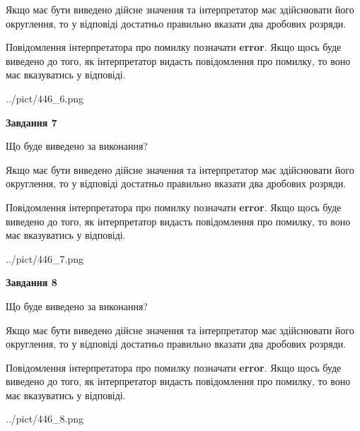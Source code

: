 \documentclass[12pt, ukrainian]{article}
\begin{document}
{\begin {Large}
Якщо має бути виведено дійсне значення та інтерпретатор має здійснювати його округлення, 
то у відповіді достатньо правильно вказати два дробових розряди.

Повідомлення інтерпретатора про помилку позначати \textbf{error}.
Якщо щось буде виведено до того, як інтерпретатор видасть повідомлення про помилку, 
то воно має вказуватись у відповіді. \par

\begin{center}
	{../pict/446_6.png}
\end{center}
\newpage

{\begin {center}\textbf{Завдання 7}\end {center}}\par
Що буде виведено за виконання? \par

Якщо має бути виведено дійсне значення та інтерпретатор має здійснювати його округлення, 
то у відповіді достатньо правильно вказати два дробових розряди.

Повідомлення інтерпретатора про помилку позначати \textbf{error}.
Якщо щось буде виведено до того, як інтерпретатор видасть повідомлення про помилку, 
то воно має вказуватись у відповіді. \par

\begin{center}
	{../pict/446_7.png}
\end{center}
\newpage

{\begin {center}\textbf{Завдання 8}\end {center}}\par
Що буде виведено за виконання? \par

Якщо має бути виведено дійсне значення та інтерпретатор має здійснювати його округлення, 
то у відповіді достатньо правильно вказати два дробових розряди.

Повідомлення інтерпретатора про помилку позначати \textbf{error}.
Якщо щось буде виведено до того, як інтерпретатор видасть повідомлення про помилку, 
то воно має вказуватись у відповіді. \par

\begin{center}
	{../pict/446_8.png}
\end{center}
\newpage


\end{Large}}
\end{document}
